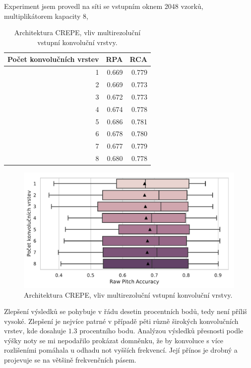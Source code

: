Experiment jsem provedl na síti se vstupním oknem 2048 vzorků, multiplikátorem kapacity 8, 

\begin{table}[h!]
\centering
    \begin{tabular}{rrr}
    \toprule
    Počet konvolučních vrstev &   RPA &   RCA \\
    \midrule
                            1 & 0.669 & 0.779 \\
                            2 & 0.669 & 0.773 \\
                            3 & 0.672 & 0.773 \\
                            4 & 0.674 & 0.778 \\
                            5 & 0.686 & 0.781 \\
                            6 & 0.678 & 0.780 \\
                            7 & 0.677 & 0.779 \\
                            8 & 0.680 & 0.778 \\
    \bottomrule
    \end{tabular}
\caption{Architektura CREPE, vliv multirezoluční vstupní konvoluční vrstvy.}\label{tab:crepe_multirozliseni}
\end{table}

\begin{figure}[h!]\centering
    \includegraphics[scale=0.6]{../img/figures/crepe_multirozliseni.pdf}
\caption{Architektura CREPE, vliv multirezoluční vstupní konvoluční vrstvy.}\label{obr:crepe_multirozliseni}
\end{figure}

Zlepšení výsledků se pohybuje v řádu desetin procentních bodů, tedy není příliš vysoké. Zlepšení je nejvíce patrné v případě pěti různě širokých konvolučních vrstev, kde dosahuje $1.3$ procentního bodu. Analýzou výsledků přesnosti podle výšky noty se mi nepodařilo prokázat domněnku, že by konvoluce s více rozlišeními pomáhala u odhadu not vyšších frekvencí. Její přínos je drobný a projevuje se na většině frekvenčních pásem.


